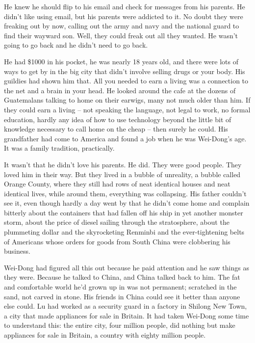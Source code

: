 He knew he should flip to his email and check for messages from his
parents. He didn't like using email, but his parents were addicted
to it. No doubt they were freaking out by now, calling out the army
and navy and the national guard to find their wayward son. Well,
they could freak out all they wanted. He wasn't going to go back
and he didn't need to go back.

He had \$1000 in his pocket, he was nearly 18 years old, and there
were lots of ways to get by in the big city that didn't involve
selling drugs or your body. His guildies had shown him that. All
you needed to earn a living was a connection to the net and a brain
in your head. He looked around the cafe at the dozens of
Guatemalans talking to home on their earwigs, many not much older
than him. If they could earn a living -- not speaking the language,
not legal to work, no formal education, hardly any idea of how to
use technology beyond the little bit of knowledge necessary to call
home on the cheap -- then surely he could. His grandfather had come
to America and found a job when he was Wei-Dong's age. It was a
family tradition, practically.

It wasn't that he didn't love his parents. He did. They were good
people. They loved him in their way. But they lived in a bubble of
unreality, a bubble called Orange County, where they still had rows
of neat identical houses and neat identical lives, while around
them, everything was collapsing. His father couldn't see it, even
though hardly a day went by that he didn't come home and complain
bitterly about the containers that had fallen off his ship in yet
another monster storm, about the price of diesel sailing through
the stratosphere, about the plummeting dollar and the skyrocketing
Renminbi and the ever-tightening belts of Americans whose orders
for goods from South China were clobbering his business.

Wei-Dong had figured all this out because he paid attention and he
saw things as they were. Because he talked to China, and China
talked back to him. The fat and comfortable world he'd grown up in
was not permanent; scratched in the sand, not carved in stone. His
friends in China could see it better than anyone else could. Lu had
worked as a security guard in a factory in Shilong New Town, a city
that made appliances for sale in Britain. It had taken Wei-Dong
some time to understand this: the entire city, four million people,
did nothing but make appliances for sale in Britain, a country with
eighty million people.


